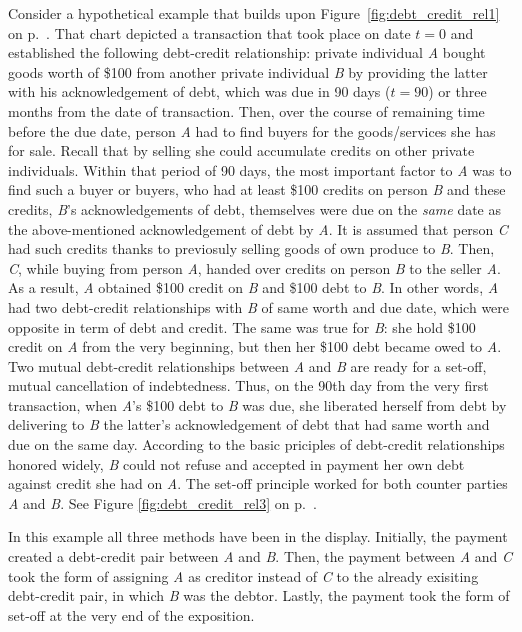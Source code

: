 Consider a hypothetical example that builds upon Figure~\ref{fig:debt_credit_rel1} on p.~\pageref{fig:debt_credit_rel1}. That chart depicted a transaction that took place on date \(t=0\) and established the following debt-credit relationship: private individual \textit{A} bought goods worth of \$100 from another private individual \textit{B} by providing the latter with his acknowledgement of debt, which was due in 90 days (\(t=90\)) or three months from the date of transaction. Then, over the course of remaining time before the due date, person \textit{A} had to find buyers for the goods/services she has for sale. Recall that by selling she could accumulate credits on other private individuals. Within that period of 90 days, the most important factor to \textit{A} was to find such a buyer or buyers, who had at least \$100 credits on person \textit{B} and these credits, \textit{B}'s acknowledgements of debt, themselves were due on the \textit{same} date as the above-mentioned acknowledgement of debt by \textit{A}. It is assumed that person \textit{C} had such credits thanks to previosuly selling goods of own produce to \textit{B}. Then, \textit{C}, while buying from person \textit{A}, handed over credits on person \textit{B} to the seller \textit{A}. As a result, \textit{A} obtained \$100 credit on \textit{B} and \$100 debt to \textit{B}. In other words, \textit{A} had two debt-credit relationships with \textit{B} of same worth and due date, which were opposite in term of debt and credit. The same was true for \textit{B}: she hold \$100 credit on \textit{A} from the very beginning, but then her \$100 debt became owed to \textit{A}. Two mutual debt-credit relationships between \textit{A} and \textit{B} are ready for a set-off, mutual cancellation of indebtedness. Thus, on the 90th day from the very first transaction, when \textit{A}'s \$100 debt to \textit{B} was due, she liberated herself from debt by delivering to \textit{B} the latter's acknowledgement of debt that had same worth and due on the same day. According to the basic priciples of debt-credit relationships honored widely, \textit{B} could not refuse and accepted in payment her own debt against credit she had on \textit{A}. The set-off principle worked for both counter parties \textit{A} and  \textit{B}. See Figure \ref{fig:debt_credit_rel3} on p.~\pageref{fig:debt_credit_rel3}.

In this example all three methods have been in the display. Initially, the payment created a debt-credit pair between \textit{A} and \textit{B}. Then, the payment between \textit{A} and \textit{C} took the form of assigning \textit{A} as creditor instead of \textit{C} to the already exisiting debt-credit pair, in which \textit{B} was the debtor. Lastly, the payment took the form of set-off at the very end of the exposition. 

